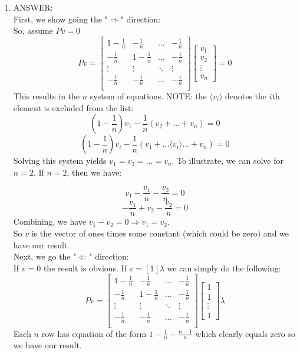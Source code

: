 \documentclass[a4paper, 12pt]{article}
\begin{document}
\begin{enumerate}
\begin{enumerate}
	\item ANSWER: 
	\\
	First, we show going the "$\Rightarrow$" direction:
	\\ So, assume $Pv = 0$
	$$Pv =  \left[ \begin{array}{cccc}  1-\frac{1}{n} & -\frac{1}{n} & \dots & -\frac{1}{n} \\
							   -\frac{1}{n} & 1-\frac{1}{n} & \dots & -\frac{1}{n} \\
							    \vdots           & \vdots           & \ddots & \vdots \\
							  -\frac{1}{n}  & -\frac{1}{n}  & \dots & -\frac{1}{n} \\	
								   \end{array}\right]  
		\left[ \begin{array}{c} v_1 \\ v_2 \\ \vdots \\ v_n \end{array}\right] = 0
		$$
	This results in the $n$ system of equations. NOTE: the $\langle v_i \rangle$ denotes the $i$th element is excluded from the list:
	\begin{equation}  \tag{eq. 1}
	(1-\frac{1}{n})v_1 - \frac{1}{n}(v_2 + ... + v_n) = 0 
	\end{equation}
	\begin{equation}  \tag{eq. i}
	(1-\frac{1}{n})v_i - \frac{1}{n}(v_1 + ...\langle v_i \rangle... + v_n) = 0 
	\end{equation}
	Solving this system yields $v_1 = v_2 = ... = v_n$. To illustrate, we can solve for $n=2$. If $n=2$, then we have:

	$$v_1 - \frac{v_1}{n} - \frac{v_2}{n} = 0 $$
	$$- \frac{v_1}{n} + v_2 - \frac{v_2}{n} = 0 $$
	Combining, we have $v_1 - v_2 = 0 \Rightarrow v_1 = v_2$.
	\\So $v$ is the vector of ones times some constant (which could be zero) and we have our result.
	\\ Next, we go the "$\Leftarrow$" direction:
	\\ If $v = 0$ the result is obvious. If $v = [1]\lambda$ we can simply do the following:
	$$Pv =  \left[ \begin{array}{cccc}  1-\frac{1}{n} & -\frac{1}{n} & \dots & -\frac{1}{n} \\
							   -\frac{1}{n} & 1-\frac{1}{n} & \dots & -\frac{1}{n} \\
							    \vdots           & \vdots           & \ddots & \vdots \\
							  -\frac{1}{n}  & -\frac{1}{n}  & \dots & -\frac{1}{n} \\	
								   \end{array}\right]  
		\left[ \begin{array}{c} 1 \\ 1 \\ \vdots \\ 1 \end{array}\right] \lambda 
		$$
	Each $n$ row has equation of the form $1 - \frac{1}{n} - \frac{n-1}{n}$ which clearly equals zero so we have our result.



\end{enumerate}
\end{enumerate}
\end{document}
